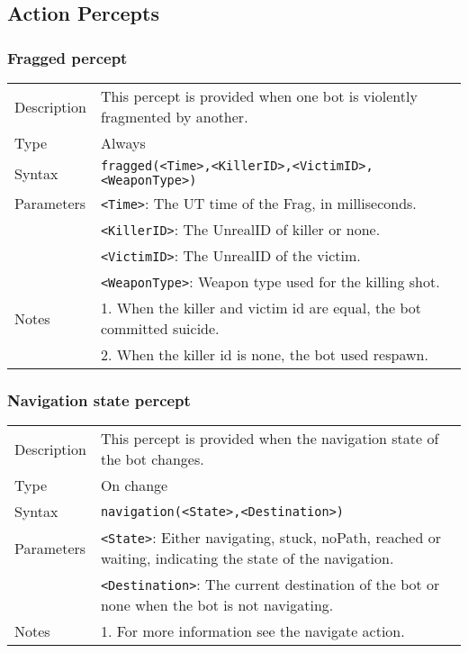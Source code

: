 \documentclass[11pt,a4paper]{article}
\begin{document}
\subsection{Action Percepts}

\subsubsection*{Fragged percept}
\begin{small}
\begin{tabular}{p{2cm}p{9cm}}
Description & This percept is provided when one bot is violently fragmented by another. \\
Type & Always\\
Syntax & \verb|fragged(<Time>,<KillerID>,<VictimID>,<WeaponType>)|\\
Parameters

& \verb|<Time>|: The UT time of the Frag, in milliseconds.\\
& \verb|<KillerID>|: The UnrealID of killer or none.\\
& \verb|<VictimID>|: The UnrealID of the victim.\\
& \verb|<WeaponType>|: Weapon type used for the killing shot.\\
Notes &
	1.	When the killer and victim id are equal, the bot committed suicide. \\
&	2.	When the killer id is none, the bot used respawn.\\
\end{tabular}
\end{small}



\subsubsection*{Navigation state percept}
\begin{small}
\begin{tabular}{p{2cm}p{9cm}}
Description & This percept is provided when the navigation state of the bot changes. \\
Type & On change\\
Syntax & \verb|navigation(<State>,<Destination>)|\\
Parameters &
\verb|<State>|: Either navigating, stuck, noPath, reached or waiting, indicating the state of the navigation. \\
& \verb|<Destination>|: The current destination of the bot or none when the bot is not navigating.\\
Notes &
	1.	For more information see the navigate action. \\
\end{tabular}
\end{small}
\end{document}
